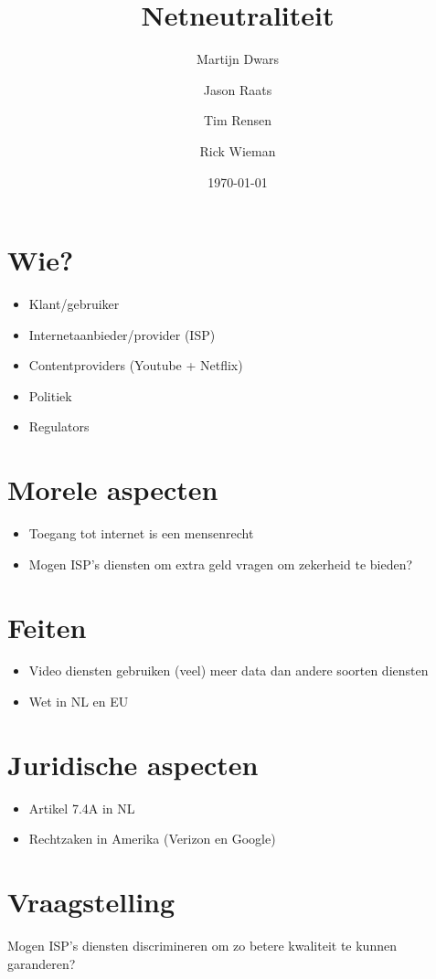 \documentclass{article}
\title{Netneutraliteit}
\author{Martijn Dwars \and Jason Raats \and Tim Rensen \and Rick Wieman}
\date{\today}
\begin{document}
\maketitle

\section{Wie?}
\begin{itemize}
\item Klant/gebruiker
\item Internetaanbieder/provider (ISP)
\item Contentproviders (Youtube + Netflix)
\item Politiek
\item Regulators
\end{itemize}

\section{Morele aspecten}
\begin{itemize}
\item Toegang tot internet is een mensenrecht
\item Mogen ISP's diensten om extra geld vragen om zekerheid te bieden?
\end{itemize}

\section{Feiten}
\begin{itemize}
\item Video diensten gebruiken (veel) meer data dan andere soorten diensten
\item Wet in NL en EU
\end{itemize}

\section{Juridische aspecten}
\begin{itemize}
\item Artikel 7.4A in NL
\item Rechtzaken in Amerika (Verizon en Google)
\end{itemize}

\section{Vraagstelling}
Mogen ISP's diensten discrimineren om zo betere kwaliteit te kunnen garanderen?
\end{document}
